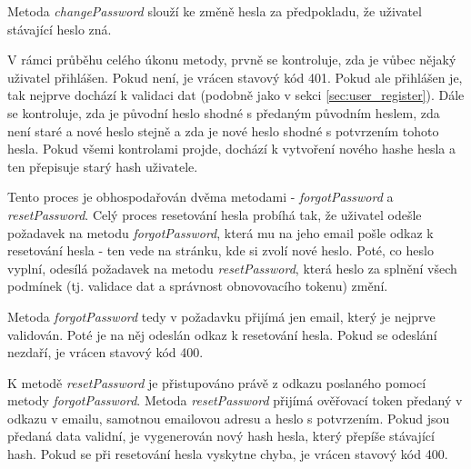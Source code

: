 			Metoda \textit{changePassword} slouží ke změně hesla za předpokladu, že uživatel stávající heslo zná.
			
			V rámci průběhu celého úkonu metody, prvně se kontroluje, zda je vůbec nějaký uživatel přihlášen. Pokud není, je vrácen stavový kód 401. Pokud ale přihlášen je, tak nejprve dochází k validaci dat (podobně jako v sekci \ref{sec:user_register}). Dále se kontroluje, zda je původní heslo shodné s předaným původním heslem, zda není staré a nové heslo stejně a zda je nové heslo shodné s potvrzením tohoto hesla. Pokud všemi kontrolami projde, dochází k vytvoření nového hashe hesla a ten přepisuje starý hash uživatele.
			
			Tento proces je obhospodařován dvěma metodami - \textit{forgotPassword} a \textit{resetPassword}. Celý proces resetování hesla probíhá tak, že uživatel odešle požadavek na metodu \textit{forgotPassword}, která mu na jeho email pošle odkaz k resetování hesla - ten vede na stránku, kde si zvolí nové heslo. Poté, co heslo vyplní, odesílá požadavek na metodu \textit{resetPassword}, která heslo za splnění všech podmínek (tj. validace dat a správnost obnovovacího tokenu) změní. 
			
			Metoda \textit{forgotPassword} tedy v požadavku přijímá jen email, který je nejprve validován. Poté je na něj odeslán odkaz k resetování hesla. Pokud se odeslání nezdaří, je vrácen stavový kód 400.
			
			K metodě \textit{resetPassword} je přistupováno právě z odkazu poslaného pomocí metody \textit{forgotPassword}. Metoda \textit{resetPassword} přijímá ověřovací token předaný v odkazu v emailu, samotnou emailovou adresu a heslo s potvrzením. Pokud jsou předaná data validní, je vygenerován nový hash hesla, který přepíše stávající hash. Pokud se při resetování hesla vyskytne chyba, je vrácen stavový kód 400.
			

